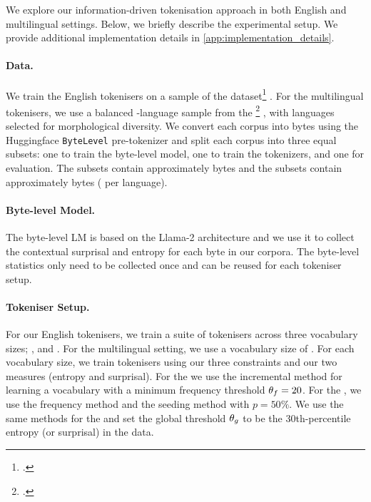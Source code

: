 We explore our information-driven tokenisation approach in both English and multilingual settings. Below, we briefly describe the experimental setup. We provide additional implementation details in \cref{app:implementation_details}.

\paragraph{Data.} 
We train the English tokenisers on a sample of the \fineweb dataset\footnote{\href{https://huggingface.co/datasets/HuggingFaceFW/fineweb-edu}{}.} \citep{penedo2024finewebdatasetsdecantingweb}.
For the multilingual tokenisers, we use a balanced -language sample from the \commoncorpus \footnote{\href{https://huggingface.co/datasets/PleIAs/common_corpus}{}.} \citep{common_corpus}, with languages selected for morphological diversity. We convert each corpus into bytes using the Huggingface \texttt{ByteLevel} pre-tokenizer and split each corpus into three equal subsets: one to train the byte-level model, one to train the tokenizers, and one for evaluation. The \fineweb subsets contain approximately  bytes and the \commoncorpus subsets contain approximately  bytes ( per language).

\paragraph{Byte-level Model.} 
The byte-level LM is based on the Llama-2 architecture \citep{touvron-2023-llama} and we use it to collect the contextual surprisal and entropy for each byte in our corpora. The byte-level statistics only need to be collected once and can be reused for each tokeniser setup.

\paragraph{Tokeniser Setup.} 
For our English tokenisers, we train a suite of tokenisers across three vocabulary sizes; ,  and . For the multilingual setting, we use a vocabulary size of . For each vocabulary size, we train tokenisers using our three constraints and our two measures (entropy and surprisal). For the  we use the incremental method for learning a vocabulary with a minimum frequency threshold $\theta_f = 20$. For the , we use the frequency method and the seeding method with $p=50\%$. We use the same methods for the  and set the global threshold $\theta_g$ to be the 30th-percentile entropy (or surprisal) in the data.

